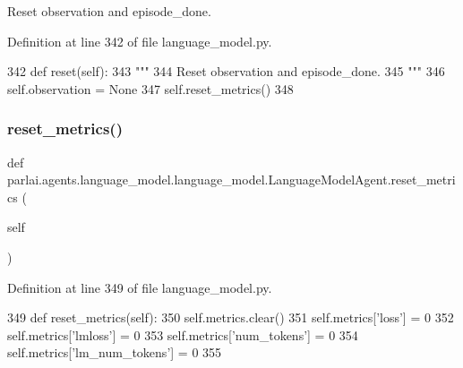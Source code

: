 \begin{DoxyVerb}Reset observation and episode_done.
\end{DoxyVerb}
 

Definition at line 342 of file language\+\_\+model.\+py.


\begin{DoxyCode}
342     \textcolor{keyword}{def }reset(self):
343         \textcolor{stringliteral}{"""}
344 \textcolor{stringliteral}{        Reset observation and episode\_done.}
345 \textcolor{stringliteral}{        """}
346         self.observation = \textcolor{keywordtype}{None}
347         self.reset\_metrics()
348 
\end{DoxyCode}
\mbox{\label{classparlai_1_1agents_1_1language__model_1_1language__model_1_1LanguageModelAgent_a62896fd9aa38b55c6ea1b8a8770e3261}} 
\subsubsection{\texorpdfstring{reset\+\_\+metrics()}{reset\_metrics()}}
{\footnotesize\ttfamily def parlai.\+agents.\+language\+\_\+model.\+language\+\_\+model.\+Language\+Model\+Agent.\+reset\+\_\+metrics (\begin{DoxyParamCaption}\item[{}]{self }\end{DoxyParamCaption})}



Definition at line 349 of file language\+\_\+model.\+py.


\begin{DoxyCode}
349     \textcolor{keyword}{def }reset\_metrics(self):
350         self.metrics.clear()
351         self.metrics[\textcolor{stringliteral}{'loss'}] = 0
352         self.metrics[\textcolor{stringliteral}{'lmloss'}] = 0
353         self.metrics[\textcolor{stringliteral}{'num\_tokens'}] = 0
354         self.metrics[\textcolor{stringliteral}{'lm\_num\_tokens'}] = 0
355 
\end{DoxyCode}
\mbox{\label{classparlai_1_1agents_1_1language__model_1_1language__model_1_1LanguageModelAgent_adc621ff0e625e2f00225d78408e9bafc}} 

